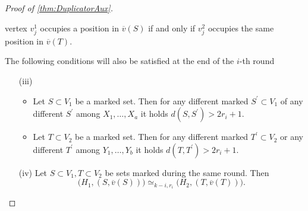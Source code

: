 \documentclass[12pt,notitlepage,a4paper]{article}
\theoremstyle{definition}
\begin{document}
\begin{proof}[Proof of \cref{thm:DuplicatorAux}]
\begin{itemize}
		vertex $v^1_j$ occupies a position in $\overline{v}(S)$
		if and only if $v^2_j$ occupies the same position 
		in $\overline{v}(T)$.
	\end{itemize}
	The following conditions will also be satisfied at the 
	end of the $i$-th round
	\begin{itemize}
		\item[(iii)] 
			\begin{itemize}
			\item  Let $S\subset V_1$ be a marked set. Then 
			for any different marked $S^\prime \subset V_1$ 
			of any different $S^\prime$ among $X_1,\dots,X_a$
			it holds $d(S,S^\prime)>2r_i + 1$. 
			\item Let $T\subset V_2$ be a marked set. Then
			for any different marked $T^\prime \subset V_2$
			or any different $T^\prime$ among
			$Y_1,\dots, Y_b$  it holds $d(T,T^\prime)>2r_i +1$.
			\end{itemize}
		\item[(iv)] Let $S\subset V_1, T\subset V_2$ be sets
		marked during the same round. Then
		\[
		\big(H_1, (S,\overline{v}(S))\big)\simeq_{k-i,r_i}
		\big(H_2, (T,\overline{v}(T))\big).	\]
					

\end{itemize}
\end{proof}
\end{document}
